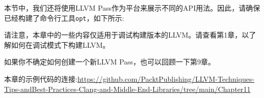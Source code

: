 本节中，我们还将使用LLVM Pass作为平台来展示不同的API用法。因此，请确保已经构建了命令行工具\texttt{opt}，如下所示:


请注意，本章中的一些内容仅适用于调试构建版本的LLVM。请查看第1章，以了解如何在调试模式下构建LLVM。

如果你不确定如何创建一个新LLVM Pass，也可以回顾一下第9章。

本章的示例代码的连接:\url{https://github.com/PacktPublishing/LLVM-Techniques-Tips-andBest-Practices-Clang-and-Middle-End-Libraries/tree/main/Chapter11}






























